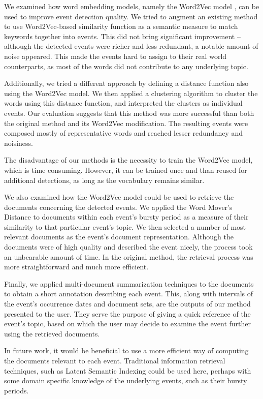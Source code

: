 We examined how word embedding models, namely the Word2Vec model \citep{word2vec}, can be used to improve event detection quality. We tried to augment an existing method to use Word2Vec-based similarity function as a semantic measure to match keywords together into events. This did not bring significant improvement -- although the detected events were richer and less redundant, a notable amount of noise appeared. This made the events hard to assign to their real world counterparts, as most of the words did not contribute to any underlying topic.

Additionally, we tried a different approach by defining a distance function also using the Word2Vec model. We then applied a clustering algorithm to cluster the words using this distance function, and interpreted the clusters as individual events. Our evaluation suggests that this method was more successful than both the original method and its Word2Vec modification. The resulting events were composed mostly of representative words and reached lesser redundancy and noisiness.

The disadvantage of our methods is the necessity to train the Word2Vec model, which is time consuming. However, it can be trained once and than reused for additional detections, as long as the vocabulary remains similar.

We also examined how the Word2Vec model could be used to retrieve the documents concerning the detected events. We applied the Word Mover's Distance \citep{wmd} to documents within each event's bursty period as a measure of their similarity to that particular event's topic. We then selected a number of most relevant documents as the event's document representation. Although the documents were of high quality and described the event nicely, the process took an unbearable amount of time. In the original method, the retrieval process was more straightforward and much more efficient.

Finally, we applied multi-document summarization techniques to the documents to obtain a short annotation describing each event. This, along with intervals of the event's occurrence dates and document sets, are the outputs of our method presented to the user. They serve the purpose of giving a quick reference of the event's topic, based on which the user may decide to examine the event further using the retrieved documents.

In future work, it would be beneficial to use a more efficient way of computing the documents relevant to each event. Traditional information retrieval techniques, such as Latent Semantic Indexing \citep{lsi} could be used here, perhaps with some domain specific knowledge of the underlying events, such as their bursty periods.


